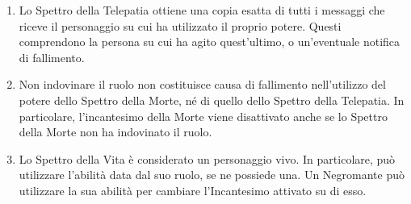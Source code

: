 \documentclass[a4paper,10pt]{article}
\begin{document}
\begin{enumerate}
%	
%
%	
%	
	
	\item Lo Spettro della Telepatia ottiene una copia esatta di tutti i messaggi che riceve il personaggio su cui ha utilizzato il proprio potere. Questi comprendono la persona su cui ha agito quest'ultimo, o un'eventuale notifica di fallimento.

	\item Non indovinare il ruolo non costituisce causa di fallimento nell'utilizzo del potere dello Spettro della Morte, né di quello dello Spettro della Telepatia. In particolare, l'incantesimo della Morte viene disattivato anche se lo Spettro della Morte non ha indovinato il ruolo.
	
	\item Lo Spettro della Vita è considerato un personaggio vivo. In particolare, può utilizzare l'abilità data dal suo ruolo, se ne possiede una. Un Negromante può utilizzare la sua abilità per cambiare l'Incantesimo attivato su di esso.
	

\end{enumerate}
\end{document}
